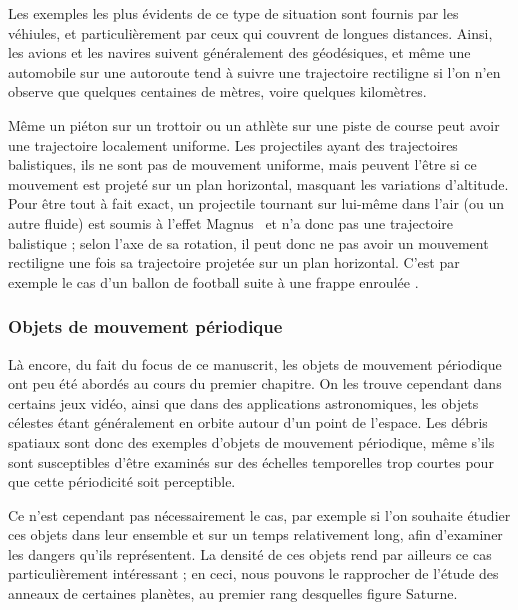 	Les exemples les plus évidents de ce type de situation sont fournis par les véhiules, et particulièrement par ceux qui couvrent de longues distances. Ainsi, les avions et les navires suivent généralement des géodésiques\footnotemark{}, et même une automobile sur une autoroute tend à suivre une trajectoire rectiligne si l'on n'en observe que quelques centaines de mètres, voire quelques kilomètres.
	
	
	Même un piéton sur un trottoir ou un athlète sur une piste de course peut avoir une trajectoire localement uniforme. Les projectiles ayant des trajectoires balistiques, ils ne sont pas de mouvement uniforme, mais peuvent l'être si ce mouvement est projeté sur un plan horizontal, masquant les variations d'altitude. Pour être tout à fait exact, un projectile tournant sur lui-même dans l'air (ou un autre fluide) est soumis à l'effet Magnus~\cite{magnus1853ueber, briggs1959effect} et n'a donc pas une trajectoire balistique ; selon l'axe de sa rotation, il peut donc ne pas avoir un mouvement rectiligne une fois sa trajectoire projetée sur un plan horizontal. C'est par exemple le cas d'un ballon de football suite à une \og frappe enroulée \fg{}.
	
	\subsubsection{Objets de mouvement périodique}
	Là encore, du fait du focus de ce manuscrit, les objets de mouvement périodique ont peu été abordés au cours du premier chapitre. On les trouve cependant dans certains jeux vidéo, ainsi que dans des applications astronomiques, les objets célestes étant généralement en orbite autour d'un point de l'espace. Les débris spatiaux sont donc des exemples d'objets de mouvement périodique, même s'ils sont susceptibles d'être examinés sur des échelles temporelles trop courtes pour que cette périodicité soit perceptible.
	
	Ce n'est cependant pas nécessairement le cas, par exemple si l'on souhaite étudier ces objets dans leur ensemble et sur un temps relativement long, afin d'examiner les dangers qu'ils représentent. La densité de ces objets rend par ailleurs ce cas particulièrement intéressant ; en ceci, nous pouvons le rapprocher de l'étude des anneaux de certaines planètes, au premier rang desquelles figure Saturne\footnotemark{}.
	
